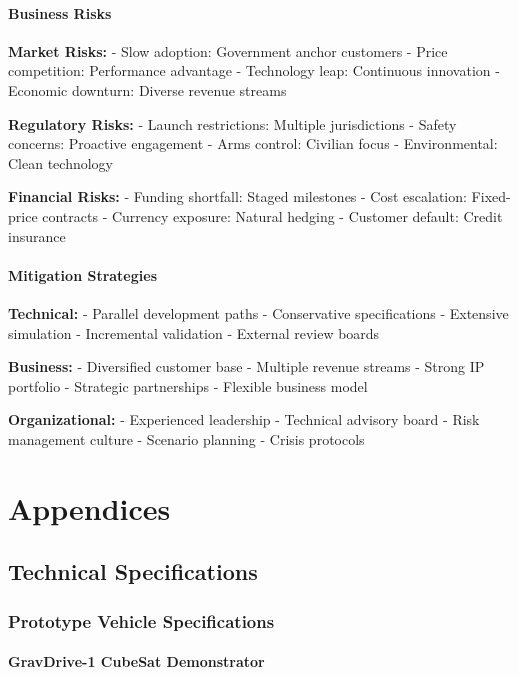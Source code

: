 \documentclass[12pt,letterpaper]{book}
\theoremstyle{definition}
\theoremstyle{plain}
\theoremstyle{remark}
\begin{document}
{{{{{\subsection{Business Risks}

\textbf{Market Risks:}
- Slow adoption: Government anchor customers
- Price competition: Performance advantage
- Technology leap: Continuous innovation
- Economic downturn: Diverse revenue streams

\textbf{Regulatory Risks:}
- Launch restrictions: Multiple jurisdictions
- Safety concerns: Proactive engagement
- Arms control: Civilian focus
- Environmental: Clean technology

\textbf{Financial Risks:}
- Funding shortfall: Staged milestones
- Cost escalation: Fixed-price contracts
- Currency exposure: Natural hedging
- Customer default: Credit insurance

\subsection{Mitigation Strategies}

\textbf{Technical:}
- Parallel development paths
- Conservative specifications
- Extensive simulation
- Incremental validation
- External review boards

\textbf{Business:}
- Diversified customer base
- Multiple revenue streams
- Strong IP portfolio
- Strategic partnerships
- Flexible business model

\textbf{Organizational:}
- Experienced leadership
- Technical advisory board
- Risk management culture
- Scenario planning
- Crisis protocols

\part{Appendices}

\appendix

\chapter{Technical Specifications}

\section{Prototype Vehicle Specifications}

\subsection{GravDrive-1 CubeSat Demonstrator}

}}}}}
\end{document}
